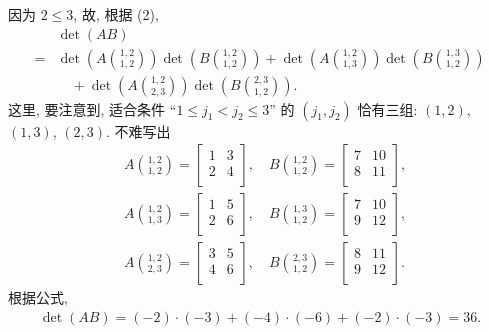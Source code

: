 \documentclass[%
    UTF8,%
    fontset=none,%
    punct=kaiming,%
    zihao=-4,%
    a4paper,%
    oneside,%
]{ctexbook}
\renewcommand*{\leq}{\leqslant}
\begin{document}
\begin{example}
    因为 \(2 \leq 3\), 故, 根据 (2),
    \begin{align*}
             & \det {(AB)}
        \\
        = {} &
        \det {\left(A\binom{1,2}{1,2}\right)}
        \det {\left(B\binom{1,2}{1,2}\right)}
        + \det {\left(A\binom{1,2}{1,3}\right)}
        \det {\left(B\binom{1,3}{1,2}\right)}
        \\
             & \quad
        + \det {\left(A\binom{1,2}{2,3}\right)}
        \det {\left(B\binom{2,3}{1,2}\right)}.
    \end{align*}
    这里, 要注意到, 适合条件
    ``\(1 \leq j_1 < j_2 \leq 3\)''
    的 \((j_1, j_2)\)
    恰有三组:
    \((1, 2)\), \((1, 3)\), \((2, 3)\).
    不难写出
    \begin{align*}
         & A\binom{1,2}{1,2}
        = \begin{bmatrix} 1&3\\2&4\\ \end{bmatrix},
        \quad
        B\binom{1,2}{1,2}
        = \begin{bmatrix} 7&10\\8&11\\ \end{bmatrix}, \\
         & A\binom{1,2}{1,3}
        = \begin{bmatrix} 1&5\\2&6\\ \end{bmatrix},
        \quad
        B\binom{1,3}{1,2}
        = \begin{bmatrix} 7&10\\9&12\\ \end{bmatrix}, \\
         & A\binom{1,2}{2,3}
        = \begin{bmatrix} 3&5\\4&6\\ \end{bmatrix},
        \quad
        B\binom{2,3}{1,2}
        = \begin{bmatrix} 8&11\\9&12\\ \end{bmatrix}.
    \end{align*}
    根据公式,
    \begin{align*}
        \det {(AB)}
        = (-2) \cdot (-3) + (-4) \cdot (-6) + (-2) \cdot (-3)
        = 36.
    \end{align*}
\end{example}
\end{document}
